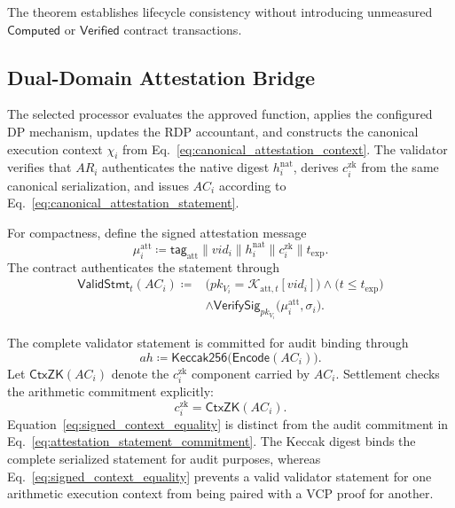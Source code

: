 \documentclass[10pt,journal,compsoc]{IEEEtran}
\begin{document}
The theorem establishes lifecycle consistency without introducing unmeasured $\mathsf{Computed}$ or $\mathsf{Verified}$ contract transactions.
\subsection{Dual-Domain Attestation Bridge}
\label{subsec:attestation_bridge}

The selected processor evaluates the approved function, applies the configured DP mechanism, updates the RDP accountant, and constructs the canonical execution context $\chi_i$ from Eq.~\eqref{eq:canonical_attestation_context}. The validator verifies that $AR_i$ authenticates the native digest $h_i^{\mathrm{nat}}$, derives $c_i^{\mathrm{zk}}$ from the same canonical serialization, and issues $AC_i$ according to Eq.~\eqref{eq:canonical_attestation_statement}.

For compactness, define the signed attestation message
\[
\mu_i^{\mathrm{att}}\coloneqq
\mathsf{tag}_{\mathrm{att}}\parallel vid_i\parallel h_i^{\mathrm{nat}}
\parallel c_i^{\mathrm{zk}}\parallel t_{\mathrm{exp}}.
\]
The contract authenticates the statement through
\begin{equation}
\begin{aligned}
\mathsf{ValidStmt}_t(AC_i)\coloneqq{}&
\bigl(
pk_{V_i}=\mathcal{K}_{\mathrm{att},t}[vid_i]
\bigr)
\land\bigl(t\leq t_{\mathrm{exp}}\bigr)\\
&\land
\mathsf{VerifySig}_{pk_{V_i}}
\bigl(\mu_i^{\mathrm{att}},\sigma_i\bigr).
\end{aligned}
\label{eq:validated_statement_predicate}
\end{equation}

The complete validator statement is committed for audit binding through
\begin{equation}
ah\coloneqq
\mathsf{Keccak256}\bigl(\mathsf{Encode}(AC_i)\bigr).
\label{eq:attestation_statement_commitment}
\end{equation}
Let $\mathsf{CtxZK}(AC_i)$ denote the $c_i^{\mathrm{zk}}$ component carried by $AC_i$. Settlement checks the arithmetic commitment explicitly:
\begin{equation}
c_i^{\mathrm{zk}}
=
\mathsf{CtxZK}(AC_i).
\label{eq:signed_context_equality}
\end{equation}
Equation~\eqref{eq:signed_context_equality} is distinct from the audit commitment in Eq.~\eqref{eq:attestation_statement_commitment}. The Keccak digest binds the complete serialized statement for audit purposes, whereas Eq.~\eqref{eq:signed_context_equality} prevents a valid validator statement for one arithmetic execution context from being paired with a VCP proof for another.
\end{document}
